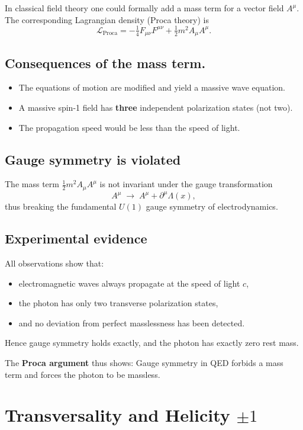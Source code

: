 In classical field theory one could formally add a mass term for a vector field \( A^\mu \).
The corresponding Lagrangian density (Proca theory) is
\[
\mathcal{L}_{\text{Proca}} = -\tfrac{1}{4} F_{\mu\nu} F^{\mu\nu} 
+ \tfrac{1}{2} m^2 A_\mu A^\mu .
\]

\subsection*{Consequences of the mass term.}
\begin{itemize}
	\item The equations of motion are modified and yield a massive wave equation.
	\item A massive spin-1 field has \textbf{three} independent polarization states (not two).
	\item The propagation speed would be less than the speed of light.
\end{itemize}

\subsection*{Gauge symmetry is violated}
The mass term \( \tfrac{1}{2} m^2 A_\mu A^\mu \) 
is not invariant under the gauge transformation
\[
A^\mu \;\to\; A^\mu + \partial^\mu \Lambda(x),
\]
thus breaking the fundamental \(U(1)\) gauge symmetry of electrodynamics.

\subsection*{Experimental evidence}
All observations show that:
\begin{itemize}
	\item electromagnetic waves always propagate at the speed of light \(c\),
	\item the photon has only two transverse polarization states,
	\item and no deviation from perfect masslessness has been detected.
\end{itemize}
Hence gauge symmetry holds exactly, and the photon has exactly zero rest mass.

\medskip
The \textbf{Proca argument} thus shows:  
Gauge symmetry in QED forbids a mass term and forces the photon to be massless.

\section{Transversality and Helicity \( \pm 1 \)}
\label{anhangA:transversalitaet}

